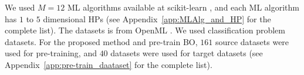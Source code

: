 We used $M = 12$ ML algorithms available at scikit-learn \cite{scikit-learn}, and 
%
each ML algorithm has $1$ to $5$ dimensional HPs (see Appendix~\ref{app:MLAlg_and_HP} for the complete list).
%
The datasets is from OpenML \cite{OpenML2013}.
%
We used classification problem datasets.
%
For the proposed method and pre-train BO, $161$ source datasets were used for pre-training, and $40$ datasets were used for target datasets (see Appendix~\ref{app:pre-train_daataset} for the complete list).
%


